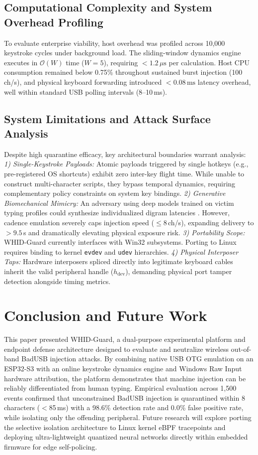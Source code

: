 \documentclass[conference]{IEEEtran}
\begin{document}
\subsection{Computational Complexity and System Overhead Profiling}
To evaluate enterprise viability, host overhead was profiled across 10,000 keystroke cycles under background load. The sliding-window dynamics engine executes in $\mathcal{O}(W)$ time ($W=5$), requiring $<1.2\,\mu\text{s}$ per calculation. Host CPU consumption remained below 0.75\% throughout sustained burst injection (100\,ch/s), and physical keyboard forwarding introduced $<0.08\,\text{ms}$ latency overhead, well within standard USB polling intervals (8--10\,ms).

\subsection{System Limitations and Attack Surface Analysis}
Despite high quarantine efficacy, key architectural boundaries warrant analysis:
\textit{1) Single-Keystroke Payloads:} Atomic payloads triggered by single hotkeys (e.g., pre-registered OS shortcuts) exhibit zero inter-key flight time. While unable to construct multi-character scripts, they bypass temporal dynamics, requiring complementary policy constraints on system key bindings.
\textit{2) Generative Biomechanical Mimicry:} An adversary using deep models trained on victim typing profiles could synthesize individualized digram latencies \cite{choi2022keystroke}. However, cadence emulation severely caps injection speed ($\le 8$\,ch/s), expanding delivery to $>9.5$\,s and dramatically elevating physical exposure risk.
\textit{3) Portability Scope:} WHID-Guard currently interfaces with Win32 subsystems. Porting to Linux requires binding to kernel \texttt{evdev} and \texttt{udev} hierarchies.
\textit{4) Physical Interposer Taps:} Hardware interposers spliced directly into legitimate keyboard cables inherit the valid peripheral handle ($h_{\text{dev}}$), demanding physical port tamper detection alongside timing metrics.

\balance
\section{Conclusion and Future Work}
This paper presented WHID-Guard, a dual-purpose experimental platform and endpoint defense architecture designed to evaluate and neutralize wireless out-of-band BadUSB injection attacks. By combining native USB OTG emulation on an ESP32-S3 with an online keystroke dynamics engine and Windows Raw Input hardware attribution, the platform demonstrates that machine injection can be reliably differentiated from human typing. Empirical evaluation across 1,500 events confirmed that unconstrained BadUSB injection is quarantined within 8 characters ($<$85\,ms) with a 98.6\% detection rate and 0.0\% false positive rate, while isolating only the offending peripheral. Future research will explore porting the selective isolation architecture to Linux kernel eBPF tracepoints and deploying ultra-lightweight quantized neural networks directly within embedded firmware for edge self-policing.
\end{document}
